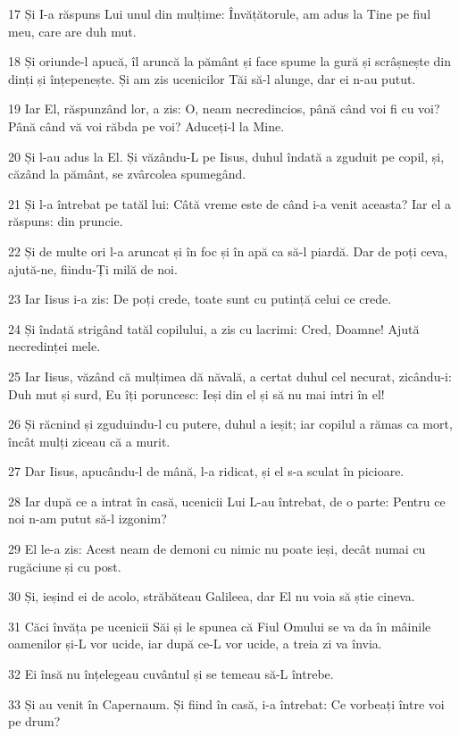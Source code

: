 \par 17 Și I-a răspuns Lui unul din mulțime: Învățătorule, am adus la Tine pe fiul meu, care are duh mut.
\par 18 Și oriunde-l apucă, îl aruncă la pământ și face spume la gură și scrâșnește din dinți și înțepenește. Și am zis ucenicilor Tăi să-l alunge, dar ei n-au putut.
\par 19 Iar El, răspunzând lor, a zis: O, neam necredincios, până când voi fi cu voi? Până când vă voi răbda pe voi? Aduceți-l la Mine.
\par 20 Și l-au adus la El. Și văzându-L pe Iisus, duhul îndată a zguduit pe copil, și, căzând la pământ, se zvârcolea spumegând.
\par 21 Și l-a întrebat pe tatăl lui: Câtă vreme este de când i-a venit aceasta? Iar el a răspuns: din pruncie.
\par 22 Și de multe ori l-a aruncat și în foc și în apă ca să-l piardă. Dar de poți ceva, ajută-ne, fiindu-Ți milă de noi.
\par 23 Iar Iisus i-a zis: De poți crede, toate sunt cu putință celui ce crede.
\par 24 Și îndată strigând tatăl copilului, a zis cu lacrimi: Cred, Doamne! Ajută necredinței mele.
\par 25 Iar Iisus, văzând că mulțimea dă năvală, a certat duhul cel necurat, zicându-i: Duh mut și surd, Eu îți poruncesc: Ieși din el și să nu mai intri în el!
\par 26 Și răcnind și zguduindu-l cu putere, duhul a ieșit; iar copilul a rămas ca mort, încât mulți ziceau că a murit.
\par 27 Dar Iisus, apucându-l de mână, l-a ridicat, și el s-a sculat în picioare.
\par 28 Iar după ce a intrat în casă, ucenicii Lui L-au întrebat, de o parte: Pentru ce noi n-am putut să-l izgonim?
\par 29 El le-a zis: Acest neam de demoni cu nimic nu poate ieși, decât numai cu rugăciune și cu post.
\par 30 Și, ieșind ei de acolo, străbăteau Galileea, dar El nu voia să știe cineva.
\par 31 Căci învăța pe ucenicii Săi și le spunea că Fiul Omului se va da în mâinile oamenilor și-L vor ucide, iar după ce-L vor ucide, a treia zi va învia.
\par 32 Ei însă nu înțelegeau cuvântul și se temeau să-L întrebe.
\par 33 Și au venit în Capernaum. Și fiind în casă, i-a întrebat: Ce vorbeați între voi pe drum?
